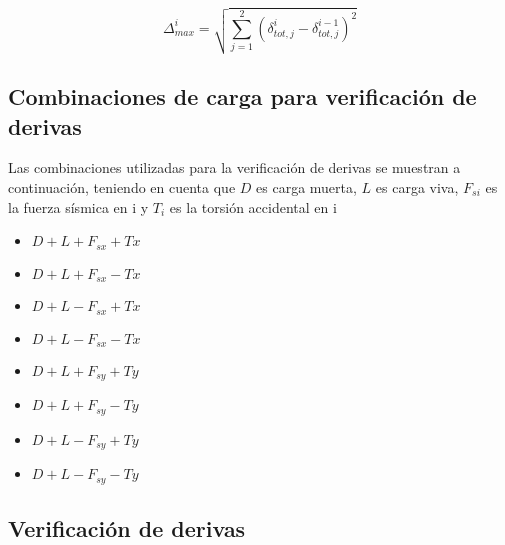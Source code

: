 \documentclass[12pt]{article}
\begin{document}
\begin{equation}
    \Delta^{i}_{max}=\sqrt{\sum_{j=1}^{2}(\delta^{i}_{tot,j}-\delta^{i-1}_{tot,j})^{2}}
\end{equation}

 
\subsection{Combinaciones de carga para verificación de derivas}

Las combinaciones utilizadas para la verificación de derivas se muestran a continuación, teniendo en cuenta que $D$ es carga muerta, $L$ es carga viva, $F_{si}$ es la fuerza sísmica en i y $T_i$ es la torsión accidental en i

\begin{itemize}
    \item $D+L+F_{sx}+Tx$
    \item $D+L+F_{sx}-Tx$
    \item $D+L-F_{sx}+Tx$
    \item $D+L-F_{sx}-Tx$
    \item $D+L+F_{sy}+Ty$
    \item $D+L+F_{sy}-Ty$
    \item $D+L-F_{sy}+Ty$
    \item $D+L-F_{sy}-Ty$
\end{itemize}
\subsection{Verificación de derivas}




 


\end{document}
